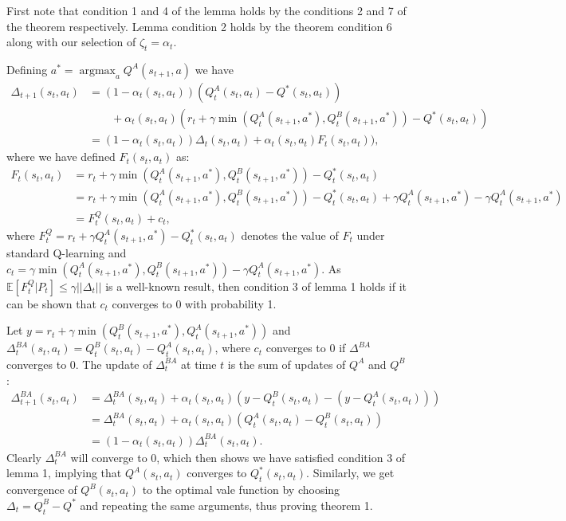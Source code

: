 \documentclass{article}
\newcommand{\y}{\gamma}
\newcommand{\E}{\mathbb{E}}
\newcommand{\lb}{\left [}
\newcommand{\rb}{\right ]}
\newcommand{\lp}{\left (}
\newcommand{\rp}{\right )}
\DeclareMathOperator*{\argmax}{argmax}
\begin{document}
First note that condition 1 and 4 of the lemma holds by the conditions 2 and 7 of the theorem respectively. Lemma condition 2 holds by the theorem condition 6 along with our selection of $\zeta_t = \alpha_t$.  

Defining $a^* = \argmax_a Q^A(s_{t+1}, a)$ we have
\begin{equation}
\begin{aligned}
\Delta_{t+1}(s_t,a_t) &= (1 - \alpha_t(s_t,a_t))(Q^A_t(s_t,a_t) - Q^*(s_t,a_t)) \\
& \qquad + \alpha_t(s_t,a_t)(r_t + \y \min (Q^A_t(s_{t+1}, a^*), Q^B_t(s_{t+1}, a^*)) - Q^*(s_t,a_t)) \\ 
&= (1 - \alpha_t(s_t,a_t))\Delta_t(s_t,a_t) + \alpha_t(s_t,a_t)F_t(s_t,a_t)), 
\end{aligned}
\end{equation}
where we have defined $F_t(s_t,a_t)$ as:
\begin{equation}
\begin{aligned}
F_t(s_t, a_t) &= r_t + \y \min (Q^A_t(s_{t+1}, a^*), Q^B_t(s_{t+1}, a^*)) - Q^*_t(s_t,a_t) \\ 
&=r_t + \y \min (Q^A_t(s_{t+1}, a^*), Q^B_t(s_{t+1}, a^*)) - Q^*_t(s_t,a_t) + \y Q^A_t(s_{t+1}, a^*) - \y Q^A_t(s_{t+1}, a^*) \\
&= F^Q_t(s_t,a_t) + c_t,  
\end{aligned}
\end{equation}
where $F^Q_t = r_t + \y Q^A_t(s_{t+1}, a^*) - Q^*_t(s_t,a_t)$ denotes the value of $F_t$ under standard Q-learning and $c_t = \y \min (Q^A_t(s_{t+1}, a^*), Q^B_t(s_{t+1}, a^*)) - \y Q^A_t(s_{t+1}, a^*)$.
As $\E \lb F^Q_t | P_t \rb \leq \y ||\Delta_t||$ is a well-known result, then condition 3 of lemma 1 holds if it can be shown that $c_t$ converges to 0 with probability 1. 

Let $y = r_t + \y \min (Q^B_t(s_{t+1}, a^*), Q^A_t(s_{t+1}, a^*))$ and $\Delta^{BA}_t(s_t,a_t) = Q^B_t(s_t,a_t) - Q^A_t(s_t,a_t)$, where $c_t$ converges to 0 if $\Delta^{BA}$ converges to 0.
The update of $\Delta^{BA}_t$ at time $t$ is the sum of updates of $Q^A$ and $Q^B$:
\begin{equation}
\begin{aligned}
\Delta^{BA}_{t+1}(s_t,a_t) &= \Delta^{BA}_t(s_t,a_t) + \alpha_t(s_t,a_t) \lp y - Q^B_t(s_t,a_t) - (y - Q^A_t(s_t,a_t)) \rp \\ 
&= \Delta^{BA}_t(s_t,a_t) + \alpha_t(s_t,a_t) \lp Q^A_t(s_t,a_t) - Q^B_t(s_t,a_t) \rp \\ 
&= (1 - \alpha_t(s_t,a_t))\Delta^{BA}_t(s_t,a_t).
\end{aligned}
\end{equation}
Clearly $\Delta^{BA}_t$ will converge to $0$, which then shows we have satisfied condition 3 of lemma 1, implying that $Q^A(s_t,a_t)$ converges to $Q^*_t(s_t,a_t)$. Similarly, we get convergence of $Q^B(s_t,a_t)$ to the optimal vale function by choosing $\Delta_t = Q^B_t - Q^*$ and repeating the same arguments, thus proving theorem 1. 
\end{document}
